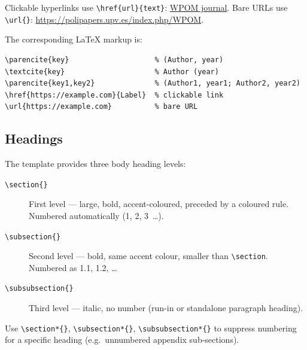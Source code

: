\documentclass{wpom-upv}
\begin{document}
Clickable hyperlinks use \verb|\href{url}{text}|:
\href{https://polipapers.upv.es/index.php/WPOM}{WPOM journal}.
Bare URLs use \verb|\url{}|:
\url{https://polipapers.upv.es/index.php/WPOM}.

The corresponding \LaTeX{} markup is:

\begin{verbatim}
\parencite{key}                    % (Author, year)
\textcite{key}                     % Author (year)
\parencite{key1,key2}              % (Author1, year1; Author2, year2)
\href{https://example.com}{Label}  % clickable link
\url{https://example.com}          % bare URL
\end{verbatim}

\subsection{Headings}

The template provides three body heading levels:

\begin{description}
  \item[\texttt{\textbackslash section\{\}}]
        First level — large, bold, \textcolor{WPOMaccent}{accent-coloured},
        preceded by a coloured rule. Numbered automatically (1, 2, 3~\ldots).
  \item[\texttt{\textbackslash subsection\{\}}]
        Second level — bold, same accent colour, smaller than \verb|\section|.
        Numbered as 1.1, 1.2, \ldots
  \item[\texttt{\textbackslash subsubsection\{\}}]
        Third level — italic, no number (run-in or standalone paragraph heading).
\end{description}

Use \verb|\section*{}|, \verb|\subsection*{}|, \verb|\subsubsection*{}| to
suppress numbering for a specific heading (e.g.\ unnumbered appendix
sub-sections).
\end{document}
